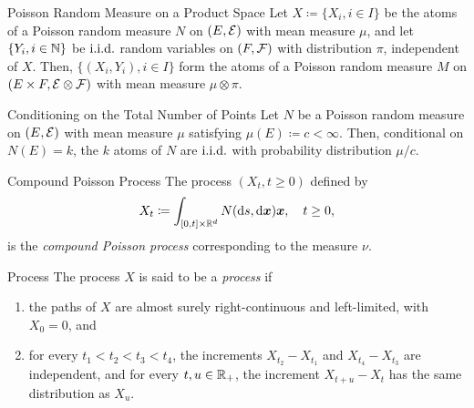 \begin{prop}{Poisson Random Measure on a Product Space}{}
	Let \(X \coloneqq \{X_i, i \in I\}\) be the atoms of a Poisson random measure \(N\) on \((E, \mathcal{E})\) with mean measure \(\mu\), and let \(\{Y_i, i \in \mathbb{N}\}\) be \(\text{i.i.d.}\) random variables on \((F, \mathcal{F})\) with distribution \(\pi\), independent of \(X\). Then, \(\{(X_i, Y_i), i \in I\}\) form the atoms of a Poisson random measure \(M\) on \((E \times F, \mathcal{E} \otimes \mathcal{F})\) with mean measure \(\mu \otimes \pi\).
\end{prop}

\begin{thm}{Conditioning on the Total Number of Points}{}
	Let \(N\) be a Poisson random measure on \((E, \mathcal{E})\) with mean measure \(\mu\) satisfying \(\mu(E) \coloneqq c < \infty\). Then, conditional on \(N(E) = k\), the \(k\) atoms of \(N\) are \(\text{i.i.d.}\) with probability distribution \(\mu/c\).
\end{thm}

\begin{defn}{Compound Poisson Process}{}
	The process \((X_t, t \ge 0)\) defined by
	\begin{equation*}
		X_t \coloneqq \int_{[0, t] \times \mathbb{R}^d} N(\mathrm{d} s, \mathrm{d} \boldsymbol{x}) \boldsymbol{x}, \quad t \ge 0,
	\end{equation*}
	is the \textit{compound Poisson process} corresponding to the measure \(\nu\).
\end{defn}

\begin{defn}{\Levy{} Process}{}
	The process \(X\) is said to be a \textit{\Levy{} process} if
	\begin{enumerate}
		\item the paths of \(X\) are almost surely right-continuous and left-limited, with \(X_0 = 0\), and
		\item for every \(t_1 < t_2 < t_3 < t_4\), the increments \(X_{t_2} - X_{t_1}\) and \(X_{t_4} - X_{t_3}\) are independent, and for every \(t, u \in \mathbb{R}_+\), the increment \(X_{t+u} - X_t\) has the same distribution as \(X_u\).
	\end{enumerate}
\end{defn}

